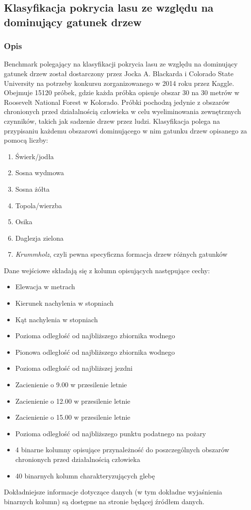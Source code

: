 \documentclass{article}
\begin{document}
\subsection{Klasyfikacja pokrycia lasu ze względu na dominujący gatunek drzew}
\subsubsection{Opis}
Benchmark polegający na klasyfikacji pokrycia lasu ze względu na dominujący gatunek drzew został dostarczony przez Jocka A. Blackarda i Colorado State University na potrzeby konkursu zorganizowanego w 2014 roku przez Kaggle. Obejmuje 15120 próbek, gdzie każda próbka opisuje obszar 30 na 30 metrów w Roosevelt National Forest w Kolorado. Próbki pochodzą jedynie z obszarów chronionych przed działalnością człowieka w celu wyeliminowania zewnętrznych czynników, takich jak sadzenie drzew przez ludzi. Klasyfikacja polega na przypisaniu każdemu obszarowi dominującego w nim gatunku drzew opisanego za pomocą liczby:
\begin{enumerate}
\item Świerk/jodła
\item Sosna wydmowa
\item Sosna żółta
\item Topola/wierzba
\item Osika
\item Daglezja zielona
\item \textit{Krummholz}, czyli pewna specyficzna formacja drzew różnych gatunków
\end{enumerate}
Dane wejściowe składają się z kolumn opisujących następujące cechy:
\begin{itemize}
\item Elewacja w metrach
\item Kierunek nachylenia w stopniach
\item Kąt nachylenia w stopniach
\item Pozioma odległość od najbliższego zbiornika wodnego
\item Pionowa odległość od najbliższego zbiornika wodnego
\item Pozioma odległość od najbliższej jezdni
\item Zacienienie o 9.00 w przesilenie letnie
\item Zacienienie o 12.00 w przesilenie letnie
\item Zacienienie o 15.00 w przesilenie letnie
\item Pozioma odległość od najbliższego punktu podatnego na pożary
\item 4 binarne kolumny opisujące przynależność do poszczególnych obszarów chronionych przed działalnością człowieka
\item 40 binarnych kolumn charakteryzujących glebę
\end{itemize}
Dokładniejsze informacje dotyczące danych (w tym dokładne wyjaśnienia binarnych kolumn) są dostępne na stronie będącej źródłem danych. 
\end{document}
